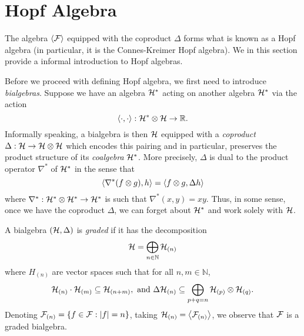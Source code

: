 \documentclass[a4paper, 10pt]{style/preprint}
\begin{document}
\section{Hopf Algebra}

The algebra \(\< \CF\>\) equipped with the coproduct \(\Delta\) forms what is known as a 
Hopf algebra (in particular, it is the Connes-Kreimer Hopf algebra). We in this section provide a 
informal introduction to Hopf algebras.

Before we proceed with defining Hopf algebra, we first need to introduce \textit{bialgebras}.
Suppose we have an algebra \({\mathcal H}^*\) acting on another algebra \({\mathcal H}^*\) via the action 
\[\< \cdot, \cdot \> : \CH^* \otimes \CH \to \mathbb{R}.\]
Informally speaking, a bialgebra is then \({\mathcal H}\) equipped with a \textit{coproduct} \(\Delta : {\mathcal H} \to {\mathcal H} \otimes {\mathcal H}\) 
which encodes this pairing and in particular, preserves the product structure of its \textit{coalgebra} \({\mathcal H}^*\). More precisely,
\(\Delta\) is dual to the product operator \(\nabla^*\) of \({\mathcal H}^*\) in the sense that 
\[\< \nabla^*(f \otimes g), h\> = \< f \otimes g, \Delta h\>\]
where \(\nabla^* : {\mathcal H}^* \otimes {\mathcal H}^* \to {\mathcal H}^*\) is such that \(\nabla^*(x, y) = xy\). Thus, in some 
sense, once we have the coproduct \(\Delta\), we can forget about \({\mathcal H}^*\) and work solely with \({\mathcal H}\).

A bialgebra \(({\mathcal H}, \Delta)\) is \textit{graded} if it has the decomposition 
\[{\mathcal H} = \bigoplus_{n \in \mathbb{N}} {\mathcal H}_{(n)}\]
where \(H_{(n)}\) are vector spaces such that for all \(n, m \in \mathbb{N}\),
\[{\mathcal H}_{(n)} \cdot {\mathcal H}_{(m)} \subseteq {\mathcal H}_{(n + m)}, \text{ and } 
  \Delta {\mathcal H}_{(n)} \subseteq \bigoplus_{p + q = n} {\mathcal H}_{(p)} \otimes {\mathcal H}_{(q)}.\]
Denoting \({\mathcal F}_{(n)} = \{f \in {\mathcal F} : |f| = n\}\), taking \(\CH_{(n)} = \< \CF_{(n)}\>\), 
we observe that \({\mathcal F}\) is a graded bialgebra. 
\end{document}
